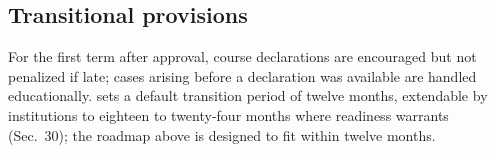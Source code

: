 \subsection{Transitional provisions}
For the first term after approval, course declarations are encouraged but not penalized if late; cases arising before a declaration was available are handled educationally. \cmo{} sets a default transition period of twelve months, extendable by institutions to eighteen to twenty-four months where readiness warrants (Sec.~30); the roadmap above is designed to fit within twelve months.
